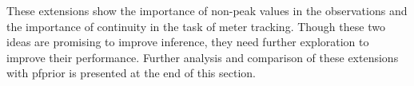 These extensions show the importance of non-peak values in the observations and the importance of continuity in the task of meter tracking. Though these two ideas are promising to improve inference, they need further exploration to improve their performance. Further analysis and comparison of these extensions with \acrshort{pfprior} is presented at the end of this section. 
% 
% 
% 
